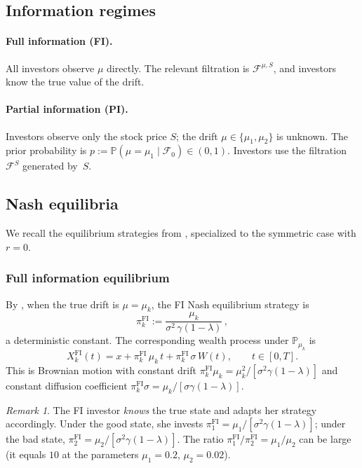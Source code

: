 \documentclass[12pt]{article}
\theoremstyle{remark}
\newtheorem{remark}[theorem]{Remark}
\theoremstyle{definition}
\newcommand{\Prob}{\mathbb{P}}
\newcommand{\FI}{\mathrm{FI}}
\begin{document}
\subsection{Information regimes}\label{sec:info}

\paragraph{Full information (FI).}
All investors observe $\mu$ directly.
The relevant filtration is $\mathcal{F}^{\mu,S}$, and investors know
the true value of the drift.

\paragraph{Partial information (PI).}
Investors observe only the stock price $S$; the drift
$\mu \in \{\mu_1, \mu_2\}$ is unknown.
The prior probability is
$p := \Prob(\mu = \mu_1 \mid \mathcal{F}_0) \in (0,1)$.
Investors use the filtration $\mathcal{F}^S$ generated by~$S$.

\subsection{Nash equilibria}\label{sec:equil}

We recall the equilibrium strategies from \citet{HuangSun2025},
specialized to the symmetric case with $r = 0$.

\subsubsection{Full information equilibrium}

By \citet[Theorem~3.1]{HuangSun2025}, when the true drift is
$\mu = \mu_k$, the FI Nash equilibrium strategy is
\begin{equation}\label{eq:piFI}
  \pi_k^{\FI} := \frac{\mu_k}{\sigma^2\,\gamma(1-\lambda)}\,,
\end{equation}
a deterministic constant.
The corresponding wealth process under $\Prob_{\mu_k}$ is
\begin{equation}\label{eq:XFI}
  X_k^{\FI}(t) = x + \pi_k^{\FI}\,\mu_k\,t
              + \pi_k^{\FI}\,\sigma\,W(t),
  \qquad t \in [0,T].
\end{equation}
This is Brownian motion with constant drift
$\pi_k^{\FI}\mu_k = \mu_k^2/[\sigma^2\gamma(1-\lambda)]$ and constant
diffusion coefficient $\pi_k^{\FI}\sigma = \mu_k/[\sigma\gamma(1-\lambda)]$.

\begin{remark}\label{rem:FI_state}
The FI investor \emph{knows} the true state and adapts her strategy
accordingly.
Under the good state, she invests
$\pi_1^{\FI} = \mu_1/[\sigma^2\gamma(1-\lambda)]$; under the bad state,
$\pi_2^{\FI} = \mu_2/[\sigma^2\gamma(1-\lambda)]$.
The ratio $\pi_1^{\FI}/\pi_2^{\FI} = \mu_1/\mu_2$ can be large
(it equals $10$ at the \citeauthor{HuangSun2025} parameters
$\mu_1 = 0.2$, $\mu_2 = 0.02$).
\end{remark}
\end{document}

